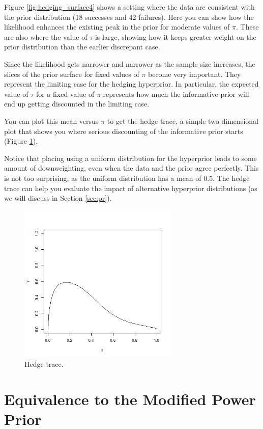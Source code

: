 \documentclass[12pt]{article}
\begin{document}
Figure \ref{fig:hedging_surface4} shows a setting where the data are consistent with the prior distribution (18 successes and 42 failures). Here you can show how the likelihood enhances the existing peak in the prior for moderate values of $\pi$. These are also where the value of $\tau$ is large, showing how it keeps greater weight on the prior distribution than the earlier discrepant case.

Since the likelihood gets narrower and narrower as the sample size increases, the slices of the prior surface for fixed values of $\pi$ become very important. They represent the limiting case for the hedging hyperprior. In particular, the expected value of $\tau$ for a fixed value of $\pi$ represents how much the informative prior will end up getting discounted in the limiting case. 

You can plot this mean versus $\pi$ to get the hedge trace, a simple two dimensional plot that shows you where serious discounting of the informative prior starts (Figure \ref{fig:hedge_trace}).

Notice that placing using a uniform distribution for the hyperprior leads to some amount of downweighting, even when the data and the prior agree perfectly. This is not too surprising, as the uniform distribution has a mean of 0.5. The hedge trace can help you evaluate the impact of alternative hyperprior distributions (as we will discuss in Section \ref{sec:pr}).

\begin{figure}
\begin{center}
\includegraphics[width=3in]{fig8.png}
\end{center}
\caption{Hedge trace. \label{fig:hedge_trace}}
\end{figure}


\section{Equivalence to the Modified Power Prior}
\label{sec:equiv}
\end{document}
